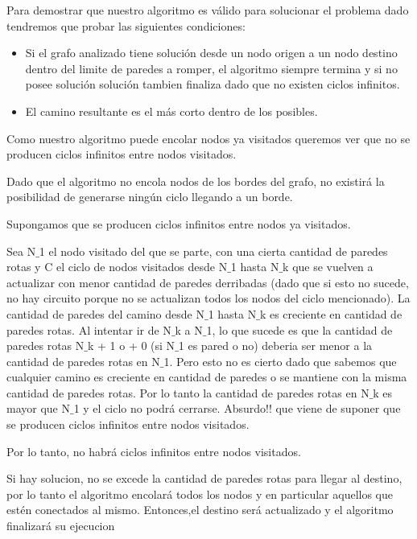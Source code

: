 Para demostrar que nuestro algoritmo es v\'alido para solucionar el problema dado tendremos que probar las siguientes condiciones:\\

\begin{itemize}
\item Si el grafo analizado tiene solución desde un nodo origen a un nodo destino dentro del limite de paredes a romper, el algoritmo siempre termina y si no posee solución solución tambien finaliza dado que no existen ciclos infinitos.
\item El camino resultante es el m\'as corto dentro de los posibles.
\end{itemize}

Como nuestro algoritmo puede encolar nodos ya visitados queremos ver que no se producen ciclos infinitos entre nodos visitados.

Dado que el algoritmo no encola nodos de los bordes del grafo, no existirá la posibilidad de generarse ningún ciclo llegando a un borde.

Supongamos que se producen ciclos infinitos entre nodos ya visitados. 

Sea N$\_$1 el nodo visitado del que se parte, con una cierta cantidad de paredes rotas y C el ciclo de nodos visitados desde N$\_$1 hasta N$\_$k que se vuelven a actualizar con menor cantidad de paredes derribadas (dado que si esto no sucede, no hay circuito porque no se actualizan todos los nodos del ciclo mencionado). 
La cantidad de paredes del camino desde N$\_$1 hasta N$\_$k es creciente en cantidad de paredes rotas. Al intentar ir de N$\_$k a N$\_$1, lo que sucede es que la cantidad de paredes rotas N$\_$k + 1 o + 0 (si N$\_$1 es pared o no) deberia ser menor a la cantidad de paredes rotas en N$\_$1. Pero esto no es cierto dado que sabemos que cualquier camino es creciente en cantidad de paredes o se mantiene con la misma cantidad de paredes rotas. Por lo tanto la cantidad de paredes rotas en N$\_$k es mayor que N$\_$1 y el ciclo no podrá cerrarse. Absurdo!! que viene de suponer que se producen ciclos infinitos entre nodos visitados.

Por lo tanto, no habrá ciclos infinitos entre nodos visitados.

Si hay solucion, no se excede la cantidad de paredes rotas para llegar al destino, por lo tanto el algoritmo encolará todos los nodos y en particular aquellos que estén conectados al mismo. Entonces,el destino será actualizado y el algoritmo finalizará su ejecucion



